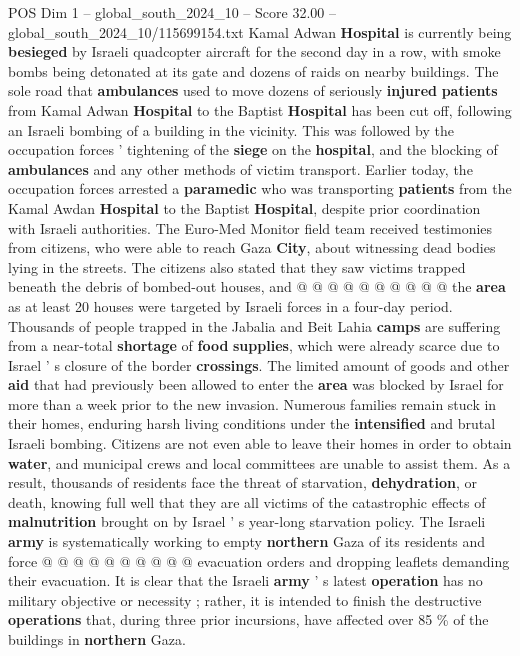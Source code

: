 \begin{textsample}{POS Dim 1 – global\_south\_2024\_10 – Score 32.00 – global\_south\_2024\_10/115699154.txt}
Kamal Adwan \textbf{Hospital} is currently being \textbf{besieged} by Israeli quadcopter aircraft for the second day in a row, with smoke bombs being detonated at its gate and dozens of raids on nearby buildings.
The sole road that \textbf{ambulances} used to move dozens of seriously \textbf{injured} \textbf{patients} from Kamal Adwan \textbf{Hospital} to the Baptist \textbf{Hospital} has been cut off, following an Israeli bombing of a building in the vicinity.
This was followed by the occupation forces ' tightening of the \textbf{siege} on the \textbf{hospital}, and the blocking of \textbf{ambulances} and any other methods of victim transport.
Earlier today, the occupation forces arrested a \textbf{paramedic} who was transporting \textbf{patients} from the Kamal Awdan \textbf{Hospital} to the Baptist \textbf{Hospital}, despite prior coordination with Israeli authorities.
The Euro-Med Monitor field team received testimonies from citizens, who were able to reach Gaza \textbf{City}, about witnessing dead bodies lying in the streets.
The citizens also stated that they saw victims trapped beneath the debris of bombed-out houses, and @ @ @ @ @ @ @ @ @ @ the \textbf{area} as at least 20 houses were targeted by Israeli forces in a four-day period.
Thousands of people trapped in the Jabalia and Beit Lahia \textbf{camps} are suffering from a near-total \textbf{shortage} of \textbf{food} \textbf{supplies}, which were already scarce due to Israel ' s closure of the border \textbf{crossings}.
The limited amount of goods and other \textbf{aid} that had previously been allowed to enter the \textbf{area} was blocked by Israel for more than a week prior to the new invasion.
Numerous families remain stuck in their homes, enduring harsh living conditions under the \textbf{intensified} and brutal Israeli bombing.
Citizens are not even able to leave their homes in order to obtain \textbf{water}, and municipal crews and local committees are unable to assist them.
As a result, thousands of residents face the threat of starvation, \textbf{dehydration}, or death, knowing full well that they are all victims of the catastrophic effects of \textbf{malnutrition} brought on by Israel ' s year-long starvation policy.
The Israeli \textbf{army} is systematically working to empty \textbf{northern} Gaza of its residents and force @ @ @ @ @ @ @ @ @ @ evacuation orders and dropping leaflets demanding their evacuation.
It is clear that the Israeli \textbf{army} ' s latest \textbf{operation} has no military objective or necessity ; rather, it is intended to finish the destructive \textbf{operations} that, during three prior incursions, have affected over 85 \% of the buildings in \textbf{northern} Gaza.

\end{textsample}

